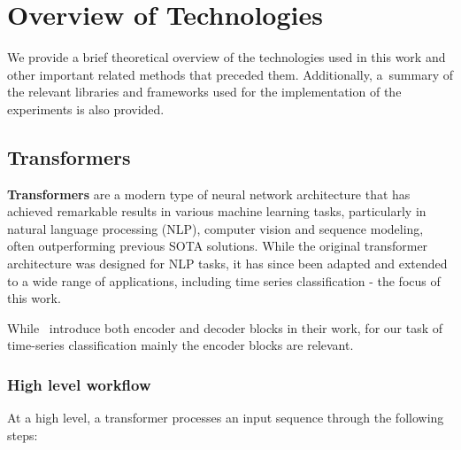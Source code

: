 \chapter{Overview of Technologies}

We provide a brief theoretical overview of the technologies used in this work and other important related methods that preceded them.
Additionally, a~summary of the relevant libraries and frameworks used for the implementation of the experiments is also provided.


\section{Transformers}

\textbf{Transformers} \parencite{AttentionIsAllYouNeed} are a modern type of neural network architecture that has achieved remarkable results in various machine learning tasks, particularly in natural language processing (NLP), computer vision and sequence modeling, often outperforming previous SOTA solutions.
While the original transformer architecture was designed for NLP tasks, it has since been adapted and extended to a wide range of applications, including time series classification - the focus of this work.

While~\cite{AttentionIsAllYouNeed} introduce both encoder and decoder blocks in their work, for our task of time-series classification mainly the encoder blocks are relevant.

\subsection{High level workflow}

At a high level, a transformer processes an input sequence through the following steps:

